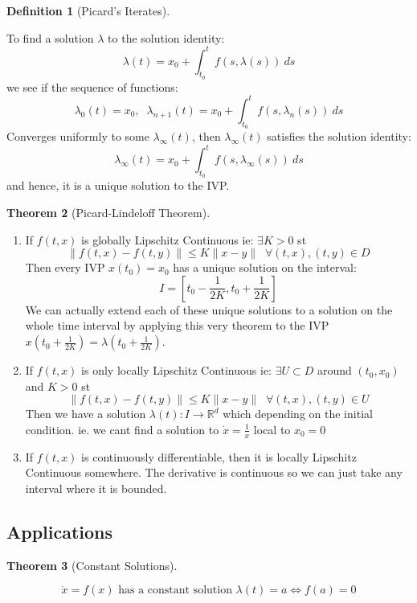 \documentclass{article}
\newtheorem{thm}{Theorem}[section]
\newtheorem{defn}[thm]{Definition}
\begin{document}
\begin{defn}[Picard's Iterates]
\end{defn}
To find a solution $\lambda$ to the solution identity:
 \[\lambda(t) = x_0 + \int_{t_0}^tf(s, \lambda (s)) \:ds\]
we see if the sequence of functions:
\[\lambda_0(t) = x_0, \;\;\lambda_{n + 1}(t) =  x_0 + \int_{t_0}^tf(s, \lambda_n (s)) \:ds\]
Converges uniformly to some $\lambda_\infty(t)$, then $\lambda_\infty(t)$ satisfies the solution identity:
\[\lambda_\infty(t) =  x_0 + \int_{t_0}^tf(s, \lambda_\infty (s)) \:ds\]
and hence, it is a unique solution to the IVP.

\begin{thm}[Picard-Lindeloff Theorem]\end{thm}
\begin{enumerate}
    \item If $f(t, x)$ is globally Lipschitz Continuous ie: $\exists K > 0$ st
    \[\| f(t,x) - f(t,y)\| \leq K \| x - y\| \;\; \forall (t,x),(t,y) \in D\]
    Then every IVP $x(t_0) = x_0$ has a unique solution on the interval:
    \[I = [t_0-\frac{1}{2K}, t_0 +\frac{1}{2K}]\]
    We can actually extend each of these unique solutions to a solution on the whole time interval by applying this very theorem to the IVP $x(t_0 + \frac{1}{2K}) = \lambda(t_0 + \frac{1}{2K})$.

    \item If $f(t, x)$ is only locally Lipschitz Continuous ie: $\exists U \subset D$ around $(t_0, x_0)$ and $K > 0$ st
    \[\| f(t,x) - f(t,y)\| \leq K \| x - y\| \;\; \forall (t,x),(t,y) \in U\]
    Then we have a solution $\lambda(t):I \to \mathbb{R}^d$ which depending on the initial condition. ie. we cant find a solution to $\dot x = \frac{1}{x}$ local to $x_0 = 0$

    \item If $f(t, x)$ is continuously differentiable, then it is locally Lipschitz Continuous somewhere. The derivative is continuous so we can just take any interval where it is bounded.
    
\end{enumerate}

\subsection{Applications}

\begin{thm}[Constant Solutions]\end{thm}
\[ \dot x = f(x) \text{ has a constant solution } \lambda(t) = a\iff f(a) = 0\]
\end{document}

